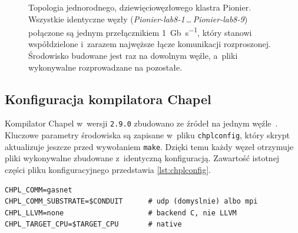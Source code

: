 \begin{figure}[H]
  \centering
  \caption[Topologia klastra Pionier]{Topologia jednorodnego, dziewięciowęzłowego klastra Pionier. Wszystkie identyczne węzły (\emph{Pionier-lab8-1}\,\dots\,\emph{Pionier-lab8-9}) połączone są jednym przełącznikiem \SI{1}{Gb\per\second}, który stanowi współdzielone i~zarazem najwęższe łącze komunikacji rozproszonej. Środowisko budowane jest raz na dowolnym węźle, a~pliki wykonywalne rozprowadzane na pozostałe.}
  \label{fig:topologia}
\end{figure}

\subsection{Konfiguracja kompilatora Chapel}

Kompilator Chapel w~wersji \texttt{2.9.0} zbudowano ze źródeł na jednym węźle~\cite{chapel-docs}. 
Kluczowe parametry środowiska są zapisane w~pliku \texttt{chplconfig}, który skrypt 
aktualizuje jeszcze przed wywołaniem \texttt{make}. Dzięki temu każdy węzeł otrzymuje pliki wykonywalne zbudowane z~identyczną konfiguracją. Zawartość istotnej części pliku konfiguracyjnego przedstawia \cref{lst:chplconfig}.

\begin{lstlisting}[style=bash, caption={Fragment pliku \texttt{chplconfig} generowanego przed budową kompilatora.}, label={lst:chplconfig}]
CHPL_COMM=gasnet
CHPL_COMM_SUBSTRATE=$CONDUIT      # udp (domyslnie) albo mpi
CHPL_LLVM=none                    # backend C, nie LLVM
CHPL_TARGET_CPU=$TARGET_CPU       # native
\end{lstlisting}

